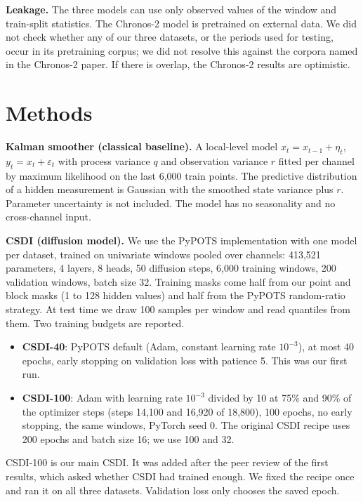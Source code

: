 \documentclass[10pt,twocolumn]{article}
\newcommand{\Chr}{Chronos-2}
\begin{document}
\textbf{Leakage.} The three models can use only observed values of the window and train-split statistics. The \Chr{} model is pretrained on external data. We did not check whether any of our three datasets, or the periods used for testing, occur in its pretraining corpus; we did not resolve this against the corpora named in the \Chr{} paper. If there is overlap, the \Chr{} results are optimistic.

\section{Methods}\label{sec:methods}
\textbf{Kalman smoother (classical baseline).} A local-level model $x_t=x_{t-1}+\eta_t$, $y_t=x_t+\varepsilon_t$ with process variance $q$ and observation variance $r$ fitted per channel by maximum likelihood on the last 6,000 train points. The predictive distribution of a hidden measurement is Gaussian with the smoothed state variance plus $r$. Parameter uncertainty is not included. The model has no seasonality and no cross-channel input.

\textbf{CSDI (diffusion model).} We use the PyPOTS implementation with one model per dataset, trained on univariate windows pooled over channels: 413,521 parameters, 4 layers, 8 heads, 50 diffusion steps, 6,000 training windows, 200 validation windows, batch size 32. Training masks come half from our point and block masks (1 to 128 hidden values) and half from the PyPOTS random-ratio strategy. At test time we draw 100 samples per window and read quantiles from them. Two training budgets are reported.
\begin{itemize}
\item \textbf{CSDI-40}: PyPOTS default (Adam, constant learning rate $10^{-3}$), at most 40 epochs, early stopping on validation loss with patience 5. This was our first run.
\item \textbf{CSDI-100}: Adam with learning rate $10^{-3}$ divided by 10 at 75\% and 90\% of the optimizer steps (steps 14,100 and 16,920 of 18,800), 100 epochs, no early stopping, the same windows, PyTorch seed 0. The original CSDI recipe uses 200 epochs and batch size 16; we use 100 and 32.
\end{itemize}
CSDI-100 is our main CSDI. It was added after the peer review of the first results, which asked whether CSDI had trained enough. We fixed the recipe once and ran it on all three datasets. Validation loss only chooses the saved epoch.
\end{document}

